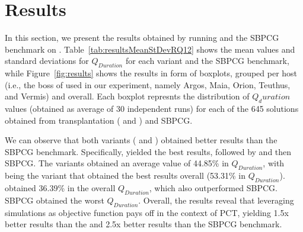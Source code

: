 \section{Results}
\label{sec:Results}
In this section, we present the results obtained by running \ApproachName{} and the SBPCG benchmark on \CaseStudy{}.
Table~\ref{tab:resultsMeanStDevRQ12} shows the mean values and standard deviations for $Q_{Duration}$ for each \ApproachName{} variant and the SBPCG benchmark, while Figure~\ref{fig:results} shows the results in form of boxplots, grouped per host (i.e., the boss of \CaseStudy{} used in our experiment, namely Argos, Maia, Orion, Teuthus, and Vermis) and overall.  Each boxplot represnts the distribution of $Q_duration$ values (obtained as average of 30 independent runs) for each of the 645 solutions obtained from transplantation \ApproachName{} (\simhotep{} and \timhotep{}) and SBPCG.

We can observe that both variants (\simhotep{} and \timhotep{}) obtained better results than the SBPCG benchmark. Specifically, \simhotep{} yielded the best results, followed by \timhotep{} and then SBPCG. The variants obtained an average value of 44.85\% in $Q_{Duration}$, with \simhotep{} being the variant that obtained the best results overall (53.31\% in $Q_{Duration}$). \timhotep obtained 36.39\% in the overall $Q_{Duration}$, which also outperformed SBPCG. SBPCG obtained the worst $Q_{Duration}$. Overall, the results reveal that leveraging simulations as objective function pays off in the context of PCT, yielding 1.5x better results than the \timhotep{} and 2.5x better results than the SBPCG benchmark.


